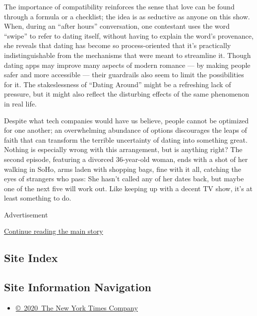 The importance of compatibility reinforces the sense that love can be
found through a formula or a checklist; the idea is as seductive as
anyone on this show. When, during an ``after hours'' conversation, one
contestant uses the word ``swipe'' to refer to dating itself, without
having to explain the word's provenance, she reveals that dating has
become so process-oriented that it's practically indistinguishable from
the mechanisms that were meant to streamline it. Though dating apps may
improve many aspects of modern romance --- by making people safer and
more accessible --- their guardrails also seem to limit the
possibilities for it. The stakeslessness of ``Dating Around'' might be a
refreshing lack of pressure, but it might also reflect the disturbing
effects of the same phenomenon in real life.

Despite what tech companies would have us believe, people cannot be
optimized for one another; an overwhelming abundance of options
discourages the leaps of faith that can transform the terrible
uncertainty of dating into something great. Nothing is especially wrong
with this arrangement, but is anything right? The second episode,
featuring a divorced 36-year-old woman, ends with a shot of her walking
in SoHo, arms laden with shopping bags, fine with it all, catching the
eyes of strangers who pass: She hasn't called any of her dates back, but
maybe one of the next five will work out. Like keeping up with a decent
TV show, it's at least something to do.

Advertisement

\protect\hyperlink{after-bottom}{Continue reading the main story}

\hypertarget{site-index}{%
\subsection{Site Index}\label{site-index}}

\hypertarget{site-information-navigation}{%
\subsection{Site Information
Navigation}\label{site-information-navigation}}

\begin{itemize}
\tightlist
\item
  \href{https://help.nytimes3xbfgragh.onion/hc/en-us/articles/115014792127-Copyright-notice}{©~2020~The
  New York Times Company}
\end{itemize}

